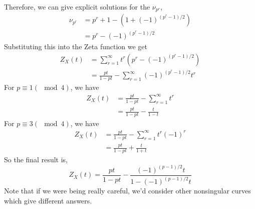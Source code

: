 \documentclass{article}
\begin{document}
Therefore, we can give explicit solutions for the \(\nu_{p^{r}}\),
\begin{subequations}
\begin{align}
\nu_{p^{r}} & = p^{r} + 1 - (1 + (-1)^{(p^{r} - 1)/2}) \\
& = p^{r} - (-1)^{(p^{r}-1)/2}
\end{align}
\end{subequations}
Substituting this into the Zeta function we get
\begin{subequations}
\begin{align}
Z_{X}(t) & = \sum_{r=1}^{\infty} t^{r}(p^{r} - (-1)^{(p^{r}-1)/2}) \\
& = \frac{pt}{1-pt} - \sum_{r=1}^{\infty}(-1)^{(p^{r}-1)/2}t^{r}
\end{align}
\end{subequations}
For \(p \equiv 1 (\mod 4)\), we have
\begin{subequations}
\begin{align}
Z_{X}(t) & =  \frac{pt}{1-pt} - \sum_{r=1}^{\infty}t^{r} \\
& = \frac{pt}{1-pt} - \frac{t}{1-t}
\end{align}
\end{subequations}
For \(p \equiv 3 (\mod 4)\), we have
\begin{subequations}
\begin{align}
Z_{X}(t) & =  \frac{pt}{1-pt} - \sum_{r=1}^{\infty}t^{r}(-1)^{r} \\
& = \frac{pt}{1-pt} + \frac{t}{1+t}
\end{align}
\end{subequations}
So the final result is,
\begin{equation}
Z_{X}(t) =  \frac{pt}{1-pt} - \frac{(-1)^{(p-1)/2}t}{1-(-1)^{(p-1)/2}t}
\end{equation}
Note that if we were being really careful, we'd consider other nonsingular curves which give different answers.
\end{document}
